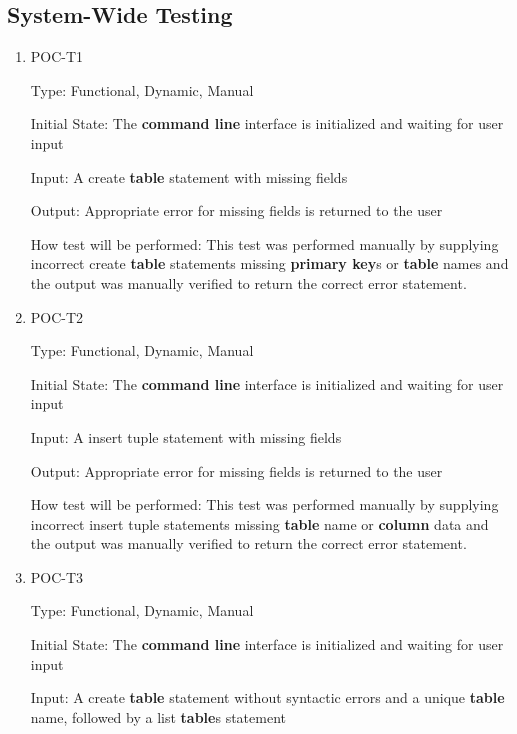 \documentclass[12pt, titlepage]{article}
\begin{document}
\subsection{System-Wide Testing}
		
\begin{enumerate}

\item{POC-T1\\}

Type: Functional, Dynamic, Manual
					
Initial State: The \textbf{command line} interface is initialized and waiting for user input
					
Input: A create \textbf{table} statement with missing fields
					
Output: Appropriate error for missing fields is returned to the user
					
How test will be performed: This test was performed manually by supplying incorrect create \textbf{table} statements missing \textbf{primary key}s or \textbf{table} names and the output was manually verified to return the correct error statement.
					
\item{POC-T2\\}

Type: Functional, Dynamic, Manual
					
Initial State: The \textbf{command line} interface is initialized and waiting for user input
					
Input: A insert tuple statement with missing fields
					
Output: Appropriate error for missing fields is returned to the user
					
How test will be performed: This test was performed manually by supplying incorrect insert tuple statements missing \textbf{table} name or \textbf{column} data and the output was manually verified to return the correct error statement. 

\item{POC-T3\\}

Type: Functional, Dynamic, Manual
					
Initial State: The \textbf{command line} interface is initialized and waiting for user input
					
Input: A create \textbf{table} statement without syntactic errors and a unique \textbf{table} name, followed by a list \textbf{table}s statement
					

\end{enumerate}
\end{document}
